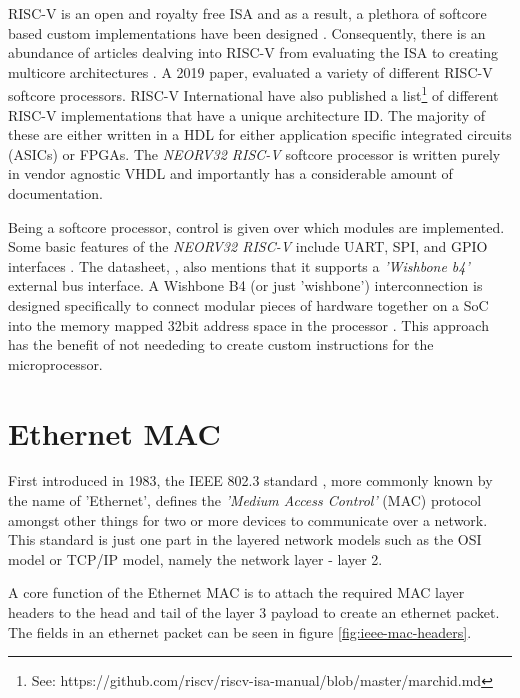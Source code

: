 RISC-V is an open and royalty free ISA and as a result, a plethora of softcore based custom implementations have been designed \cite{CatalogRISCSoftcore}. 
Consequently, there is an abundance of articles dealving into RISC-V from evaluating the ISA \cite{InvestigatingRiscv} to creating multicore architectures
\cite{RiscVMulticore}. A 2019 paper, \cite{CatalogRISCSoftcore} evaluated a variety of different RISC-V softcore processors. RISC-V International have 
also published a list\footnote[1]{See: https://github.com/riscv/riscv-isa-manual/blob/master/marchid.md} of different RISC-V implementations 
that have a unique architecture ID. The majority of these are either written in a HDL for either application specific integrated circuits (ASICs) or FPGAs.
The \textit{NEORV32 RISC-V} softcore processor is written purely in vendor agnostic VHDL and importantly has a considerable amount of documentation. 

Being a softcore processor, control is given over which modules are implemented. Some basic features of the \textit{NEORV32 RISC-V} include 
UART, SPI, and GPIO interfaces \cite{neorv32Datasheet}. The datasheet, \cite{neorv32Datasheet}, also mentions that it supports a \textit{'Wishbone b4'} 
external bus interface. A Wishbone B4 (or just 'wishbone') interconnection is designed specifically to connect modular pieces of hardware together on a 
SoC into the memory mapped 32bit address space in the processor \cite{WishboneSpec}. This approach has the benefit of not neededing to create custom 
instructions for the microprocessor. 

\newpage

\section{Ethernet MAC}

First introduced in 1983, the IEEE 802.3 standard \cite{IEEE802.3-2012}, more commonly known by the name of 'Ethernet', defines the \textit{'Medium Access Control'} 
(MAC) protocol amongst other things for two or more devices to communicate over a network. This standard is just one part in the layered network 
models such as the OSI model or TCP/IP model, namely the network layer - layer 2. 


A core function of the Ethernet MAC is to attach the required MAC layer headers to the head and tail of the layer 3 payload to create an ethernet packet. The fields 
in an ethernet packet can be seen in figure \ref{fig:ieee-mac-headers}. 

